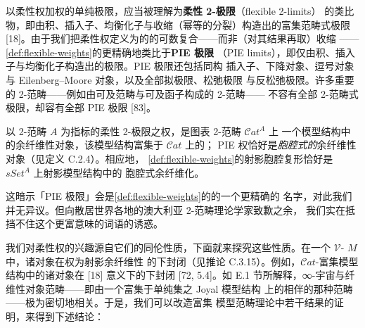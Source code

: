 \begin{digression}[论 2-范畴理论中的柔性极限]\label{dig:flexible-2-limits}
以柔性权加权的单纯极限，应当被理解为\textbf{柔性 2-极限}（flexible 2-limits）
的类比物，即由积、插入子、均衡化子与收缩（幂等的分裂）构造出的富集范畴式极限
[18]。由于我们把柔性权定义为\trCoproduct{}的\trPushout{}的可数复合——而非（对其结果再取）收缩
——\cref{def:flexible-weights}的\trFlexibleWeightedLimit{}更精确地类比于\textbf{PIE 极限}%
（PIE limits），即仅由积、插入子与均衡化子构造出的极限。PIE 极限还包括同构
插入子、下降对象、逗号对象与 Eilenberg--Moore 对象，以及全部拟极限、松弛极限
与反松弛极限。许多重要的 2-范畴——例如由可及范畴与可及函子构成的 2-范畴——
不容有全部 2-范畴式极限，却容有全部 PIE 极限 [83]。

以 2-范畴 $A$ 为指标的柔性 2-极限之权，是图表 2-范畴 $\mathcal{C}at^{A}$ 上
一个模型结构中的余纤维性对象，该模型结构富集于 $\mathcal{C}at$ 上的\trFolkModelStructure；
PIE 权恰好是\emph{胞腔式的}余纤维性对象（见定义 C.2.4）。相应地，
\cref{def:flexible-weights}的射影胞腔复形恰好是 $sSet^{A}$ 上射影模型结构中的
胞腔式余纤维化。
\end{digression}

这暗示「PIE 极限」会是\cref{def:flexible-weights}的\trFlexibleWeightedLimit{}的一个更精确的
名字，对此我们并无异议。但向散居世界各地的澳大利亚 2-范畴理论学家致歉之余，
我们实在抵挡不住这个更富意味的词语的诱惑。

我们对柔性权的兴趣源自它们的同伦性质，下面就来探究这些性质。在一个
$\mathcal{V}$-\trModelCategory{} $M$ 中，诸\trFibrant{}对象在权为射影余纤维性
的\trWeightedLimit{}下封闭（见推论 C.3.15）。例如，$\mathcal{C}at$-富集模型
结构中的诸\trFibrant{}对象在 [18] 意义下的\trFlexibleWeightedLimit{}下封闭 [72, 5.4]。如
E.1 节所解释，∞-宇宙与纤维性对象范畴——即由一个富集于单纯集之 Joyal 模型结构
上的\trModelCategory{}相伴的那种范畴——极为密切地相关。于是，我们可以改造富集
模型范畴理论中若干结果的证明，来得到下述结论：

